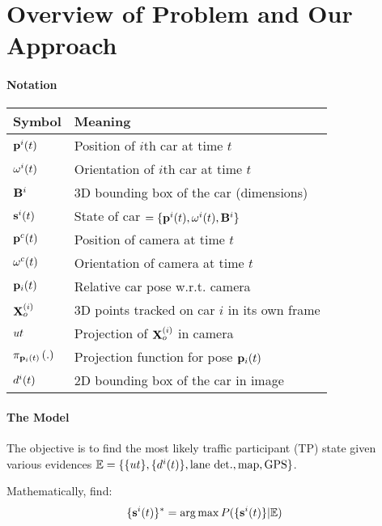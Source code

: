 \section{Overview of Problem and Our Approach}

\paragraph{Notation}


\begin{table}[h]
  \begin{tabular}{|l|l|}
    \hline
    Symbol & Meaning \\
    \hline
    $\mathbf{p}^{i}({t})$ & Position of $i$th car at time $t$\\
    $\mathbf{\omega}^{i}(t)$ & Orientation of $i$th car at time $t$\\
     $\mathbf{B}^{i}$ & 3D bounding box of the car (dimensions)\\
    $\mathbf{s}^{i}(t)$ & State of car $=\{\mathbf{p}^{i}({t}), \mathbf{\omega}^{i}(t), \mathbf{B}^{i}\}$\\
    $\mathbf{p}^{c}({t})$ & Position of camera at time $t$\\
    $\mathbf{\omega}^{c}(t)$ & Orientation of camera at time $t$\\
    $\mathbf{p}_{i}({t})$ & Relative car pose w.r.t. camera \\
    $\mathbf{X}^{(i)}_o$ & 3D points tracked on car $i$ in its own frame\\
    $ut$ & Projection of $\mathbf{X}^{(i)}_o$ in camera\\
    $\pi_{\mathbf{p}_{i}({t})}\left(.\right)$ & Projection function for pose $\mathbf{p}_{i}({t})$\\
    $d^{i}(t)$ & 2D bounding box of the car in image\\
    \hline
  \end{tabular}
\end{table}

\paragraph{The Model}

The objective is to find the most likely traffic participant (TP) state given
various evidences $\mathbb{E} = \{\{ut\}, \{d^{i}(t)\}, \text{lane det.},
\text{map}, \text{GPS}\}$.

Mathematically, find:
\begin{align}
  \{\mathbf{s}^{i}(t)\}^* &= \arg \max P(\{\mathbf{s}^{i}(t)\} | \mathbb{E})
\end{align}

